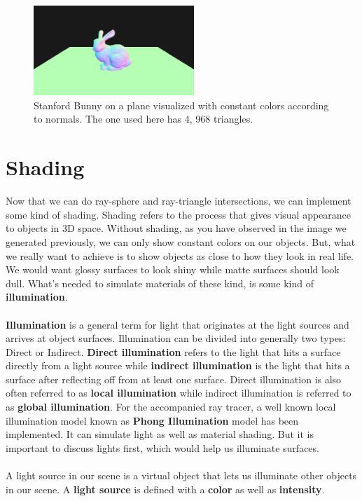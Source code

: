 \documentclass[11pt,a4paper]{article}
\begin{document}
\\
\begin{figure}[H]
	\centering
	\captionsetup{justification=centering}
	\includegraphics[width=0.54\textwidth]{normal_mesh.png}\quad
	\caption{Stanford Bunny on a plane visualized with constant colors according to normals. The one used here has 4, 968 triangles.}
\end{figure}

\endgroup

	\section{Shading}
	Now that we can do ray-sphere and ray-triangle intersections, we can implement some kind of shading. Shading refers to the process that gives visual appearance to objects in 3D space. Without shading, as you have observed in the image we generated previously, we can only show constant colors on our objects. But, what we really want to achieve is to show objects as close to how they look in real life. We would want glossy surfaces to look shiny while matte surfaces should look dull. What's needed to simulate materials of these kind, is some kind of \textbf{illumination}.
	\\~\\
	\textbf{Illumination} is a general term for light that originates at the light sources and arrives at object surfaces. Illumination can be divided into generally two types: Direct or Indirect. \textbf{Direct illumination} refers to the light that hits a surface directly from a light source while \textbf{indirect illumination} is the light that hits a surface after reflecting off from at least one surface. Direct illumination is also often referred to as \textbf{local illumination} while indirect illumination is referred to as \textbf{global illumination}. For the accompanied ray tracer, a well known local illumination model known as \textbf{Phong Illumination} model \cite{phong} has been implemented. It can simulate light as well as material shading. But it is important to discuss lights first, which would help us illuminate surfaces.
	\\~\\
	A light source in our scene is a virtual object that lets us illuminate other objects in our scene. A \textbf{light source} is defined with a \textbf{color} as well as \textbf{intensity}.
\end{document}
